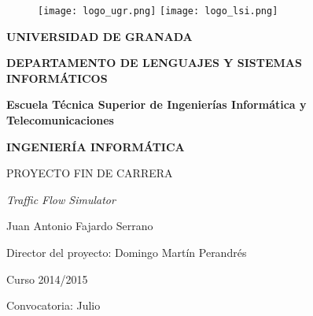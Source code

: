 \begin{titlepage}

	\begin{figure}[htbp] 
		\centering 
		\texttt{[image: logo\_ugr.png]}
		\hspace{3.0cm}
		\texttt{[image: logo\_lsi.png]}
	\end{figure}
    
	\begin{center}
	
		\vspace{1.0cm}
		
		\LARGE{\textbf{UNIVERSIDAD DE GRANADA}} \\
		
		\vspace{1.0cm}
		
		\LARGE{\textbf{DEPARTAMENTO DE LENGUAJES Y SISTEMAS INFORMÁTICOS}} \\
		
		\vspace{1.0cm}
		
		\textbf{Escuela Técnica Superior de Ingenierías Informática y Telecomunicaciones} \\
		
		\vspace{1.0cm}
		
		\Large{\textbf{INGENIERÍA INFORMÁTICA}} \\
		
		\vspace{1.0cm}
		
		\Large{PROYECTO FIN DE CARRERA} \\
		
		\vspace{0.5cm}

		\Large{\emph{Traffic Flow Simulator}} \\
		
		\vspace{1cm}
		
		\Large{Juan Antonio Fajardo Serrano} \\
		
		\vspace{0.5cm}
		
		\Large{Director del proyecto: Domingo Martín Perandrés} \\
		
		\vspace{0.5cm}
		
		\small{Curso 2014/2015}
		
		\vspace{0.2cm}
		
		\small{Convocatoria: Julio}
		
	\end{center}
\end{titlepage}
